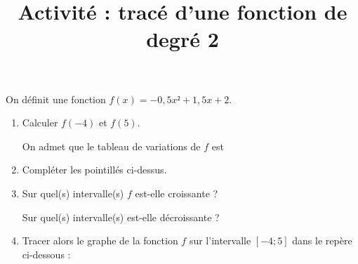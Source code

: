 \documentclass[
	classe=$1^{ere}STI2D$,
	headerTitle=Activité,
]{exercice}
\title{Activité : tracé d'une fonction de degré 2}
\newcommand{\Repere}[4]{%
	\draw[thin,gray] (#1,#2) grid (#3,#4);
	\draw[thick,->] (#1,0) -- (#3,0);
	\draw[thick,->] (0,#2) -- (0,#4);
	\draw[thick] (1,0) -- ++(0,-0.2) node[below] {$1$};
	\draw[thick] (0,1) -- ++(-0.2,0) node[left] {$1$};
}
\newcommand{\FunctionF}[1]{-0.5*(#1 + 1)*(#1 - 4)}
\begin{document}
\maketitle

On définit une fonction $f(x) = -0,5x² + 1,5x + 2$.

\begin{enumerate}
	\item Calculer $f(-4)$ et $f(5)$.  \bigskip

	      On admet que le tableau de variations de $f$ est

	      \begin{center}
	      \end{center}

	\item Compléter les pointillés ci-dessus.
	\item Sur quel(s) intervalle(s) $f$ est-elle croissante ? \correction{$\intervalle{]}{-∞}{1,5}{]}$}

	      Sur quel(s) intervalle(s) est-elle décroissante ? \correction{$\intervalle{[}{1,5}{+∞}{[}$}
	\item Tracer alors le graphe de la fonction $f$ sur l'intervalle $[-4 ; 5]$ dans le repère ci-dessous :

	      \begin{center}
	      \end{center}
\end{enumerate}
\end{document}
